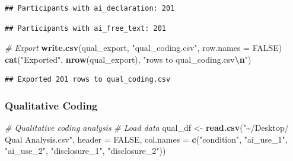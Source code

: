 \documentclass[
]{article}
\newenvironment{Shaded}{\begin{snugshade}}{\end{snugshade}}
\newcommand{\AttributeTok}[1]{\textcolor[rgb]{0.13,0.29,0.53}{#1}}
\newcommand{\CommentTok}[1]{\textcolor[rgb]{0.56,0.35,0.01}{\textit{#1}}}
\newcommand{\ConstantTok}[1]{\textcolor[rgb]{0.56,0.35,0.01}{#1}}
\newcommand{\FunctionTok}[1]{\textcolor[rgb]{0.13,0.29,0.53}{\textbf{#1}}}
\newcommand{\NormalTok}[1]{#1}
\newcommand{\OtherTok}[1]{\textcolor[rgb]{0.56,0.35,0.01}{#1}}
\newcommand{\SpecialCharTok}[1]{\textcolor[rgb]{0.81,0.36,0.00}{\textbf{#1}}}
\newcommand{\StringTok}[1]{\textcolor[rgb]{0.31,0.60,0.02}{#1}}
\begin{document}
\begin{verbatim}
## Participants with ai_declaration: 201
\end{verbatim}

\begin{Shaded}
\end{Shaded}

\begin{verbatim}
## Participants with ai_free_text: 201
\end{verbatim}

\begin{Shaded}
\begin{Highlighting}[]
\CommentTok{\# Export}
\FunctionTok{write.csv}\NormalTok{(qual\_export, }\StringTok{"qual\_coding.csv"}\NormalTok{, }\AttributeTok{row.names =} \ConstantTok{FALSE}\NormalTok{)}
\FunctionTok{cat}\NormalTok{(}\StringTok{"Exported"}\NormalTok{, }\FunctionTok{nrow}\NormalTok{(qual\_export), }\StringTok{"rows to qual\_coding.csv}\SpecialCharTok{\textbackslash{}n}\StringTok{"}\NormalTok{)}
\end{Highlighting}
\end{Shaded}

\begin{verbatim}
## Exported 201 rows to qual_coding.csv
\end{verbatim}

\subsubsection{Qualitative Coding}\label{qualitative-coding}

\begin{Shaded}
\begin{Highlighting}[]
\CommentTok{\# Qualitative coding analysis}
\CommentTok{\# Load data}
\NormalTok{qual\_df }\OtherTok{\textless{}{-}} \FunctionTok{read.csv}\NormalTok{(}\StringTok{"\textasciitilde{}/Desktop/ Qual Analysis.csv"}\NormalTok{, }
                    \AttributeTok{header =} \ConstantTok{FALSE}\NormalTok{,}
                    \AttributeTok{col.names =} \FunctionTok{c}\NormalTok{(}\StringTok{"condition"}\NormalTok{, }\StringTok{"ai\_use\_1"}\NormalTok{, }\StringTok{"ai\_use\_2"}\NormalTok{, }
                                  \StringTok{"disclosure\_1"}\NormalTok{, }\StringTok{"disclosure\_2"}\NormalTok{))}
\end{Highlighting}
\end{Shaded}
\end{document}
